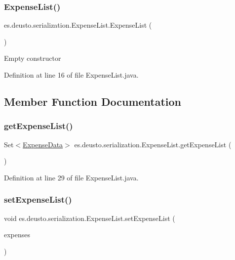 \subsubsection{\texorpdfstring{Expense\+List()}{ExpenseList()}}
{\footnotesize\ttfamily es.\+deusto.\+serialization.\+Expense\+List.\+Expense\+List (\begin{DoxyParamCaption}{ }\end{DoxyParamCaption})}

Empty constructor 

Definition at line 16 of file Expense\+List.\+java.



\subsection{Member Function Documentation}
\mbox{\label{classes_1_1deusto_1_1serialization_1_1_expense_list_aa54bbdc7fde1b0c4f6be8e5af053f4c4}} 
\subsubsection{\texorpdfstring{get\+Expense\+List()}{getExpenseList()}}
{\footnotesize\ttfamily Set$<$\hyperlink{classes_1_1deusto_1_1serialization_1_1_expense_data}{Expense\+Data}$>$ es.\+deusto.\+serialization.\+Expense\+List.\+get\+Expense\+List (\begin{DoxyParamCaption}{ }\end{DoxyParamCaption})}



Definition at line 29 of file Expense\+List.\+java.

\mbox{\label{classes_1_1deusto_1_1serialization_1_1_expense_list_a0ab9d9c259b8a4bcb1a1891f8ea85520}} 
\subsubsection{\texorpdfstring{set\+Expense\+List()}{setExpenseList()}}
{\footnotesize\ttfamily void es.\+deusto.\+serialization.\+Expense\+List.\+set\+Expense\+List (\begin{DoxyParamCaption}\item[{Set$<$ \hyperlink{classes_1_1deusto_1_1serialization_1_1_expense_data}{Expense\+Data} $>$}]{expenses }\end{DoxyParamCaption})}

